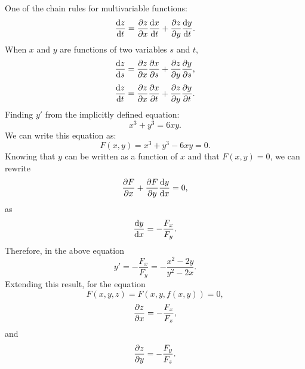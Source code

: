 \documentclass{article}
\begin{document}
One of the chain rules for multivariable functions:
\[\dv{z}{t} = \pdv{z}{x}\dv{x}{t} + \pdv{z}{y}\dv{y}{t}.\]
When $x$ and $y$ are functions of two variables $s$ and $t$, 
\[\dv{z}{s} = \pdv{z}{x}\pdv{x}{s} + \pdv{z}{y}\pdv{y}{s},\]
\[\dv{z}{t} = \pdv{z}{x}\pdv{x}{t} + \pdv{z}{y}\pdv{y}{t}.\]
Finding $y'$ from the implicitly defined equation:
\[x^3 + y^3 = 6xy.\]
We can write this equation as:
\[F(x,y) = x^3 + y^3 - 6xy = 0.\]
Knowing that $y$ can be written as a function of $x$ and that 
$F(x,y) = 0$, we can rewrite 
\[\pdv{F}{x} + \pdv{F}{y}\dv{y}{x} = 0,\]
as \[\dv{y}{x} = -\frac{F_x}{F_y}.\]
Therefore, in the above equation 
\[y' = -\frac{F_x}{F_y} = -\frac{x^2 - 2y}{y^2 -2x}.\]
Extending this result, for the equation
\[F(x,y,z)=F(x,y,f(x,y))=0,\]
\[\pdv{z}{x} = -\frac{F_x}{F_z},\] and
\[\pdv{z}{y} = -\frac{F_y}{F_z}.\]
\end{document}
